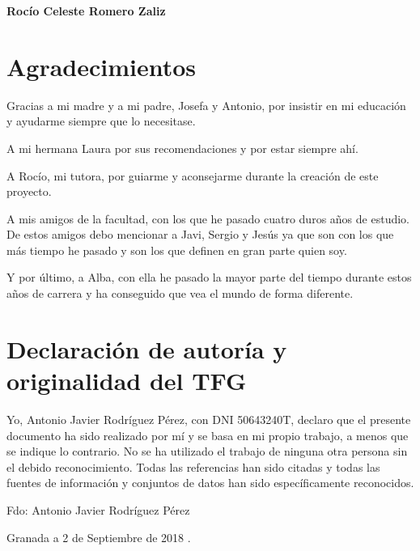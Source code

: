 \noindent \textbf{Rocío Celeste Romero Zaliz}

\chapter*{Agradecimientos}
\thispagestyle{empty}

       \vspace{1cm}

Gracias a mi madre y a mi padre, Josefa y Antonio, por insistir en mi educación y ayudarme siempre que lo necesitase.

\bigskip

A mi hermana Laura por sus recomendaciones y por estar siempre ahí.

\bigskip

A Rocío, mi tutora, por guiarme y aconsejarme durante la creación de este proyecto.

\bigskip

A mis amigos de la facultad, con los que he pasado cuatro duros años de estudio. De estos amigos debo mencionar a Javi, Sergio y Jesús ya que son con los que más tiempo he pasado y son los que definen en gran parte quien soy.

\bigskip

Y por último, a Alba, con ella he pasado la mayor parte del tiempo durante estos años de carrera y ha conseguido que vea el mundo de forma diferente.



\chapter*{Declaración de autoría y originalidad del TFG}
\thispagestyle{empty}

Yo, Antonio Javier Rodríguez Pérez, con DNI 50643240T, declaro que el presente documento ha sido realizado por mí y se basa en mi propio trabajo, a menos que se indique lo contrario. No se ha utilizado el trabajo de ninguna otra persona sin el debido reconocimiento. Todas las referencias han sido citadas y todas las fuentes de información y conjuntos de datos han sido específicamente reconocidos.

\vspace{6cm}

\noindent Fdo: Antonio Javier Rodríguez Pérez

\vspace{2cm}

\begin{flushright}
Granada a 2 de Septiembre de 2018 .
\end{flushright}